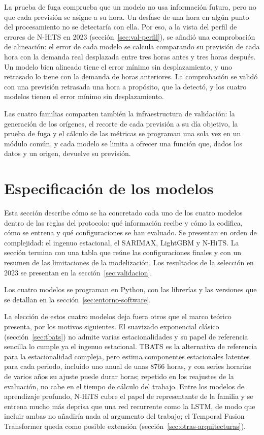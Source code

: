 La prueba de fuga comprueba que un modelo no usa información futura, pero no
que cada previsión se asigne a su hora. Un desfase de una hora en algún punto
del procesamiento no se detectaría con ella. Por eso, a la vista del perfil
de errores de N-HiTS en 2023 (sección~\ref{sec:val-perfil}), se añadió una
comprobación de alineación: el error de cada modelo se calcula comparando su
previsión de cada hora con la demanda real desplazada entre tres horas antes
y tres horas después. Un modelo bien alineado tiene el error mínimo sin
desplazamiento, y uno retrasado lo tiene con la demanda de horas anteriores.
La comprobación se validó con una previsión retrasada una hora a propósito,
que la detectó, y los cuatro modelos tienen el error mínimo sin
desplazamiento.

Las cuatro familias comparten también la infraestructura de validación: la
generación de los orígenes, el recorte de cada previsión a su día objetivo,
la prueba de fuga y el cálculo de las métricas se programan una sola vez en
un módulo común, y cada modelo se limita a ofrecer una función que, dados los
datos y un origen, devuelve su previsión.

\section{Especificación de los modelos}\label{sec:especificacion}

Esta sección describe cómo se ha concretado cada uno de los cuatro modelos
dentro de las reglas del protocolo: qué información recibe y cómo la
codifica, cómo se entrena y qué configuraciones se han evaluado. Se presentan
en orden de complejidad: el ingenuo estacional, el SARIMAX, LightGBM y
N-HiTS. La sección termina con una tabla que reúne las configuraciones
finales y con un resumen de las limitaciones de la modelización. Los
resultados de la selección en 2023 se presentan en la
sección~\ref{sec:validacion}.

Los cuatro modelos se programan en Python, con las librerías y las versiones
que se detallan en la sección~\ref{sec:entorno-software}.

La elección de estos cuatro modelos deja fuera otros que el marco teórico
presenta, por los motivos siguientes. El suavizado exponencial clásico
(sección~\ref{sec:tbats}) no admite varias estacionalidades y su papel de
referencia sencilla lo cumple ya el ingenuo estacional. TBATS es la
alternativa de referencia para la estacionalidad compleja, pero estima
componentes estacionales latentes para cada periodo, incluido uno anual de
unas 8766 horas, y con series horarias de varios años su ajuste puede durar
horas; repetido en los reajustes de la evaluación, no cabe en el tiempo de
cálculo del trabajo. Entre los modelos de aprendizaje profundo, N-HiTS cubre
el papel de representante de la familia y se entrena mucho más deprisa que
una red recurrente como la LSTM, de modo que incluir ambas no añadiría nada
al argumento del trabajo; el Temporal Fusion Transformer queda como posible
extensión (sección~\ref{sec:otras-arquitecturas}).

